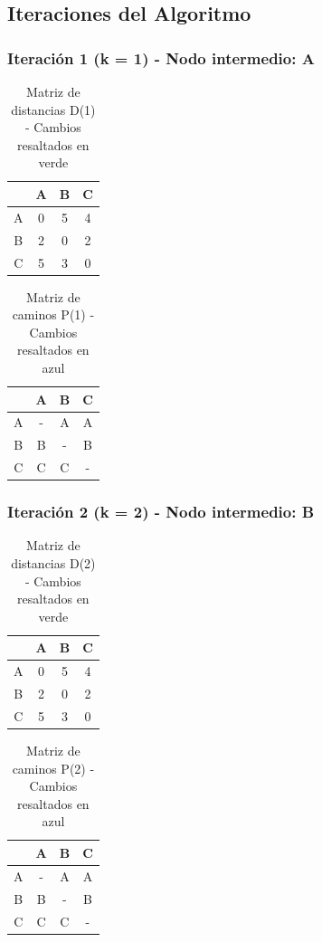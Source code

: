 \documentclass[12pt]{article}
\begin{document}
\clearpage
\subsection{Iteraciones del Algoritmo}
\subsubsection{Iteración 1 (k = 1) - Nodo intermedio: A}
\begin{table}[h!]
\centering
\begin{tabular}{|c|c|c|c|}
\hline
 & A & B & C \\\hline
A & 0 & 5 & 4 \\\hline
B & 2 & 0 & 2 \\\hline
C & 5 & 3 & 0 \\\hline
\end{tabular}
\caption{Matriz de distancias D(1) - Cambios resaltados en verde}
\end{table}

\begin{table}[h!]
\centering
\begin{tabular}{|c|c|c|c|}
\hline
 & A & B & C \\\hline
A & - & A & A \\\hline
B & B & - & B \\\hline
C & C & C & - \\\hline
\end{tabular}
\caption{Matriz de caminos P(1) - Cambios resaltados en azul}
\end{table}

\subsubsection{Iteración 2 (k = 2) - Nodo intermedio: B}
\begin{table}[h!]
\centering
\begin{tabular}{|c|c|c|c|}
\hline
 & A & B & C \\\hline
A & 0 & 5 & 4 \\\hline
B & 2 & 0 & 2 \\\hline
C & 5 & 3 & 0 \\\hline
\end{tabular}
\caption{Matriz de distancias D(2) - Cambios resaltados en verde}
\end{table}

\begin{table}[h!]
\centering
\begin{tabular}{|c|c|c|c|}
\hline
 & A & B & C \\\hline
A & - & A & A \\\hline
B & B & - & B \\\hline
C & C & C & - \\\hline
\end{tabular}
\caption{Matriz de caminos P(2) - Cambios resaltados en azul}
\end{table}
\end{document}
